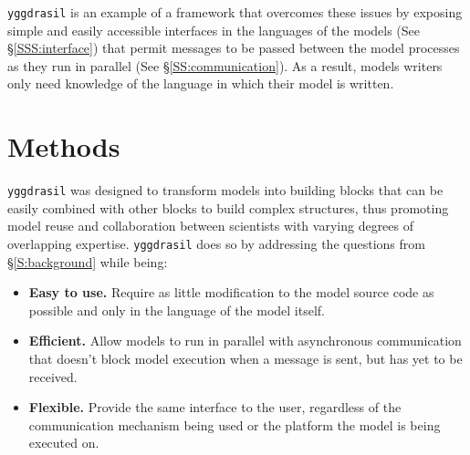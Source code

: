 \documentclass[journal]{IEEEtran}
\newcommand{\pkg}{{\tt yggdrasil}{}}
\begin{document}
{\pkg} is an example of a framework that overcomes these issues by exposing simple and easily accessible interfaces in the languages of the models (See \S\ref{SSS:interface}) that permit messages to be passed between the model processes as they run in parallel (See \S\ref{SS:communication}). As a result, models writers only need knowledge of the language in which their model is written.

%

\section{Methods}\label{S:methods}

{\pkg} was designed to transform models into building blocks that can be easily combined with other blocks to build complex structures, thus promoting model reuse and collaboration between scientists with varying degrees of overlapping expertise. {\pkg} does so by addressing the questions from \S\ref{S:background} while being:

\begin{itemize}
	\item {\bf Easy to use.} Require as little modification to the model source code as possible and only in the language of the model itself.
	\item {\bf Efficient.} Allow models to run in parallel with asynchronous communication that doesn't block model execution when a message is sent, but has yet to be received.
	\item {\bf Flexible.} Provide the same interface to the user, regardless of the communication mechanism being used or the platform the model is being executed on.
\end{itemize}
\end{document}
